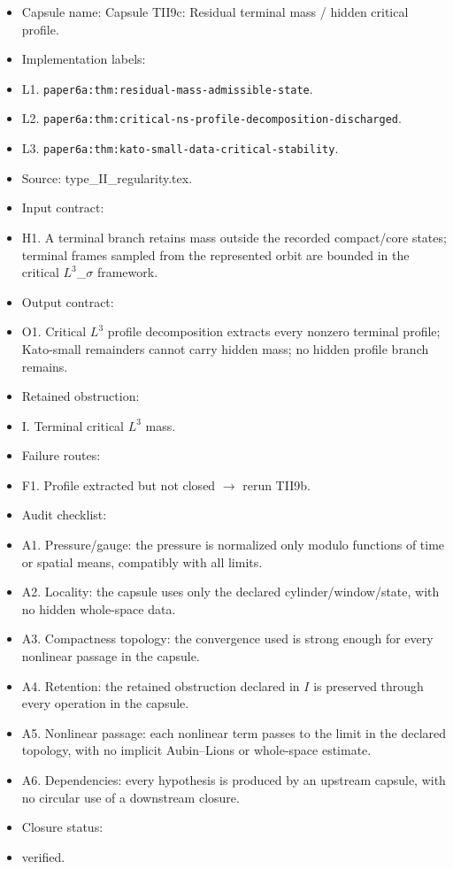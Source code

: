 \documentclass[11pt]{amsart}
\begin{document}
\begin{itemize}
  \item Capsule name: Capsule TII9c: Residual terminal mass / hidden critical profile.
  \item Implementation labels:
  \item L1. \texttt{paper6a:thm:residual-mass-admissible-state}.
  \item L2. \texttt{paper6a:thm:critical-ns-profile-decomposition-discharged}.
  \item L3. \texttt{paper6a:thm:kato-small-data-critical-stability}.
  \item Source: type\_II\_regularity.tex.
  \item Input contract:
  \item H1. A terminal branch retains mass outside the recorded compact/core states; terminal frames sampled from the represented orbit are bounded in the critical $L^3$\_$\sigma$ framework.
  \item Output contract:
  \item O1. Critical $L^3$ profile decomposition extracts every nonzero terminal profile; Kato-small remainders cannot carry hidden mass; no hidden profile branch remains.
  \item Retained obstruction:
  \item I. Terminal critical $L^3$ mass.
  \item Failure routes:
  \item F1. Profile extracted but not closed $\to$ rerun TII9b.
  \item Audit checklist:
  \item A1. Pressure/gauge: the pressure is normalized only modulo functions of time or spatial means, compatibly with all limits.
  \item A2. Locality: the capsule uses only the declared cylinder/window/state, with no hidden whole-space data.
  \item A3. Compactness topology: the convergence used is strong enough for every nonlinear passage in the capsule.
  \item A4. Retention: the retained obstruction declared in $I$ is preserved through every operation in the capsule.
  \item A5. Nonlinear passage: each nonlinear term passes to the limit in the declared topology, with no implicit Aubin--Lions or whole-space estimate.
  \item A6. Dependencies: every hypothesis is produced by an upstream capsule, with no circular use of a downstream closure.
  \item Closure status:
  \item verified.
\end{itemize}
\end{document}
